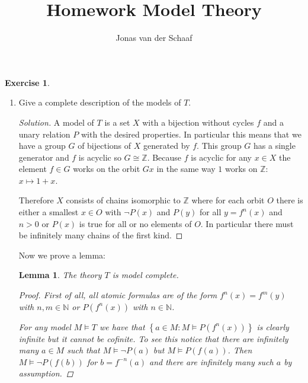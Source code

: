 \documentclass{article}
\title{Homework Model Theory}
\author{Jonas van der Schaaf}
\date{}
\renewcommand{\qedsymbol}{\raisebox{-0.5cm}{}}
\newcommand{\N}{\mathbb{N}}
\newcommand{\Z}{\mathbb{Z}}
\newcommand{\setwith}[2]{\left\{#1:#2\right\}}
\newenvironment{solution}{\begin{proof}[Solution]\renewcommand\qedsymbol{}}{\end{proof}}
\newtheorem{lemma}{Lemma}
\theoremstyle{definition}
\newtheorem{question}{Exercise}
\begin{document}
\maketitle

\begin{question}\,
    \begin{enumerate}[(1)]
        \item Give a complete description of the models of \(T\).

              \begin{solution}
                  A model of \(T\) is a set \(X\) with a bijection without
                  cycles \(f\) and a unary relation \(P\) with the desired
                  properties. In particular this means that we have a group
                  \(G\) of bijections of \(X\) generated by \(f\). This group
                  \(G\) has a single generator and \(f\) is acyclic so
                  \(G\cong\Z\). Because \(f\) is acyclic for any \(x\in X\) the
                  element \(f\in G\) works on the orbit \(Gx\) in the same way
                  \(1\) works on \(\Z\): \(x\mapsto 1+x\).

                  Therefore \(X\) consists of chains isomorphic to \(\Z\) where
                  for each orbit \(O\) there is either a smallest \(x\in O\)
                  with \(\neg P(x)\) and \(P(y)\) for all \(y=f^{n}(x)\) and
                  \(n>0\) or \(P(x)\) is true for all or no elements of \(O\).
                  In particular there must be infinitely many chains of the
                  first kind.
              \end{solution}

              Now we prove a lemma:

              \begin{lemma}
                  The theory \(T\) is model complete.

                  \begin{proof}
                      First of all, all atomic formulas are of the form
                      \(f^{n}(x)=f^{m}(y)\) with \(n,m\in\N\) or \(P(f^{n}(x))\)
                      with \(n\in\N\).

                      For any model \(M\models T\) we have that \(\setwith{a\in
                          M}{M\models P(f^{n}(x))}\) is clearly infinite but it
                      cannot be cofinite. To see this notice that there are
                      infinitely many \(a\in M\) such that \(M\models\neg
                      P(a)\) but \(M\models P(f(a))\). Then \(M\models\neg
                      P(f(b))\) for \(b=f^{-n}(a)\) and there are infinitely
                      many such \(a\) by assumption.


\end{proof}
\end{lemma}
\end{enumerate}
\end{question}
\end{document}
